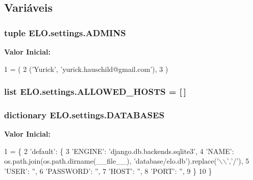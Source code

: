 \subsection{Variáveis}
\hypertarget{namespaceELO_1_1settings_a051220bd8105ba13b2720df11c1950ba}{
\subsubsection[{A\-D\-M\-I\-N\-S}]{\setlength{\rightskip}{0pt plus 5cm}tuple E\-L\-O.\-settings.\-A\-D\-M\-I\-N\-S}}\label{namespaceELO_1_1settings_a051220bd8105ba13b2720df11c1950ba}
{\bfseries Valor Inicial\-:}
\begin{DoxyCode}
1 = (
2     (\textcolor{stringliteral}{'Yurick'}, \textcolor{stringliteral}{'yurick.hauschild@gmail.com'}),
3 )
\end{DoxyCode}
\hypertarget{namespaceELO_1_1settings_afd72644768367440ae1a89e9fe95cde5}{
\subsubsection[{A\-L\-L\-O\-W\-E\-D\-\_\-\-H\-O\-S\-T\-S}]{\setlength{\rightskip}{0pt plus 5cm}list E\-L\-O.\-settings.\-A\-L\-L\-O\-W\-E\-D\-\_\-\-H\-O\-S\-T\-S = \mbox{[}$\,$\mbox{]}}}\label{namespaceELO_1_1settings_afd72644768367440ae1a89e9fe95cde5}
\hypertarget{namespaceELO_1_1settings_a91ed1425b7f1cf041960832ce5b54b6e}{
\subsubsection[{D\-A\-T\-A\-B\-A\-S\-E\-S}]{\setlength{\rightskip}{0pt plus 5cm}dictionary E\-L\-O.\-settings.\-D\-A\-T\-A\-B\-A\-S\-E\-S}}\label{namespaceELO_1_1settings_a91ed1425b7f1cf041960832ce5b54b6e}
{\bfseries Valor Inicial\-:}
\begin{DoxyCode}
1 = \{
2     \textcolor{stringliteral}{'default'}: \{
3         \textcolor{stringliteral}{'ENGINE'}: \textcolor{stringliteral}{'django.db.backends.sqlite3'}, 
4         \textcolor{stringliteral}{'NAME'}: os.path.join(os.path.dirname(\_\_file\_\_), \textcolor{stringliteral}{'database/elo.db'}).replace(\textcolor{stringliteral}{'\(\backslash\)\(\backslash\)'},\textcolor{stringliteral}{'/'}),
5         \textcolor{stringliteral}{'USER'}: \textcolor{stringliteral}{''},
6         \textcolor{stringliteral}{'PASSWORD'}: \textcolor{stringliteral}{''},
7         \textcolor{stringliteral}{'HOST'}: \textcolor{stringliteral}{''},
8         \textcolor{stringliteral}{'PORT'}: \textcolor{stringliteral}{''},
9     \}
10 \}
\end{DoxyCode}
